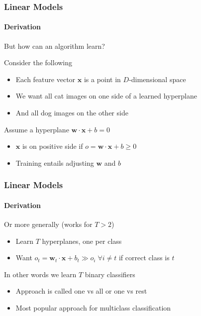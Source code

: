 \documentclass[xetex,professionalfont]{beamer}
\renewcommand\emph[1]{\textcolor{tuwcvl_cvl_blue}{#1}}
\renewcommand{\vec}[1]{\ensuremath{\mathbf{#1}}}
\newcommand{\vw}{\vec{w}}
\newcommand{\vx}{\vec{x}}
\begin{document}
\begin{frame}
\frametitle{Linear Models}
\framesubtitle{Derivation}

But how can an algorithm learn?

\bigskip

Consider the following
\begin{itemize}
    \item Each feature vector $\vx$ is a point in $D$-dimensional space %
    \item We want all cat images on one side of a learned hyperplane
    \item And all dog images on the other side %
\end{itemize}

\bigskip

Assume a hyperplane $\vw\cdot\vx+b=0$ %
\begin{itemize}
    \item $\vx$ is on positive side if $o=\vw\cdot\vx+b\geq0$ %
    \item Training entails adjusting $\vw$ and $b$ %
\end{itemize}

\end{frame}


\begin{frame}
  \frametitle{Linear Models}
  \framesubtitle{Derivation}

Or more generally (works for $T>2$)
\begin{itemize}
    \item Learn $T$ hyperplanes, one per class
    \item Want $o_t=\vw_t\cdot\vx+b_t\gg o_{i}\;\forall i\neq t$ if correct class is $t$
\end{itemize}

\bigskip

In other words we learn $T$ binary classifiers
\begin{itemize}
  \item Approach is called \emph{one vs all} or \emph{one vs rest}
  \item Most popular approach for \emph{multiclass classification}
\end{itemize}

\end{frame}
\end{document}
